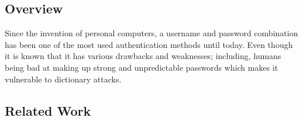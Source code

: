\documentclass[../main.tex]{subfiles}
\begin{document}
\subsection{Overview}
Since the invention of personal computers, a username and password combination
has been one of the most used authentication methods until today. Even though it is 
known that it has various drawbacks and weaknesses; including, humans being bad
at making up strong and unpredictable passwords which makes it vulnerable to
dictionary attacks. 

\subsection{Related Work}
\end{document}
